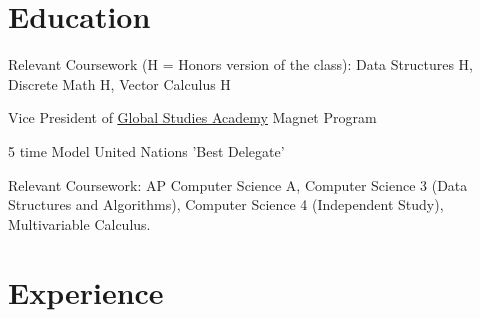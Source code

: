 \documentclass[]{deedy-resume-openfont}
\begin{document}
\hfill
\begin{minipage}[t]{0.66\textwidth} 


\section{Education}
\vspace{2 mm}
\vspace{\topsep} 
\begin{tightemize}
\item Relevant Coursework (H = Honors version of the class):
Data Structures H, Discrete Math H, Vector Calculus H
\end{tightemize}
\vspace{4 mm}
\begin{tightemize}
\item Vice President of \underline{\href{https://www.fortbendisd.com/globalstudies}{Global Studies Academy}} Magnet Program
\vspace{1 mm}
\item 5 time Model United Nations 'Best Delegate'
\vspace{1 mm}
\item Relevant Coursework: AP Computer Science A, Computer Science 3 (Data Structures and Algorithms), Computer Science 4 (Independent Study), Multivariable Calculus.
\end{tightemize}


\vspace{2 mm}
\section{Experience}
\vspace{2 mm}


\end{minipage}
\end{document}
